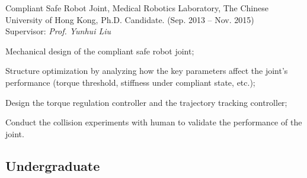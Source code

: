 \documentclass[10pt,letterpaper]{article}
\renewenvironment{itemize}{
  \begin{list}{}{
    \setlength{\leftmargin}{1.5em}
    \setlength{\itemsep}{0.25em}
    \setlength{\parskip}{0pt}
    \setlength{\parsep}{0.25em}
  }
}{
  \end{list}
}
\begin{document}
\begin{itemize}
\item Compliant Safe Robot Joint, Medical Robotics Laboratory, The Chinese University of Hong Kong, Ph.D. Candidate. (Sep. 2013 -- Nov. 2015) \\
  Supervisor: \textit{Prof. Yunhui Liu}
  \begin{itemize}
  \item Mechanical design of the compliant safe robot joint;
  \item Structure optimization by analyzing how the key parameters affect the joint's performance (torque threshold, stiffness under compliant state, etc.);
  \item Design the torque regulation controller and the trajectory tracking controller;
  \item Conduct the collision experiments with human to validate the performance of the joint.
  \end{itemize}
\end{itemize}

\subsection*{Undergraduate}
\end{document}
